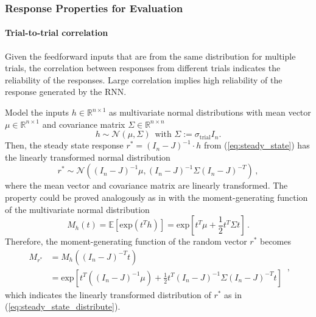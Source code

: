 \documentclass[11pt]{article}
\begin{document}
	\subsubsection{Response Properties for Evaluation} \label{sec:response_properties_for_evaluation}
	\paragraph{Trial-to-trial correlation} \label{para:ttc_sym}
	Given the feedforward inputs that are from the same distribution for multiple trials, the correlation between responses from different trials indicates the reliability of the responses. Large correlation implies high reliability of the response generated by the RNN. 
	
	Model the inputs $h \in \mathbb{R} ^{n \times 1}$ as multivariate normal distributions with mean vector $\mu \in \mathbb{R}^{n \times 1}$ and covariance matrix $\Sigma \in \mathbb{R}^{n \times n}$
		\begin{equation} \label{eq:input_distribution}
			h \sim \mathcal{N} (\mu, \Sigma) \, \text{ with } \Sigma := \sigma_{\text{trial}}I_n. 
		\end{equation}
	Then, the steady state response $r^* = (I_n - J)^{-1} \cdot h $ from (\ref{eq:steady_state}) has the linearly transformed normal distribution
		\begin{equation} \label{eq:steady_state_distribute}
			r^* \sim \mathcal{N} \left((I_n - J)^{-1}\mu, (I_n - J)^{-1} \Sigma (I_n -J)^{-T}\right) \, ,
		\end{equation}
	where the mean vector and covariance matrix are linearly transformed. The property could be proved analogously as in \cite{Soch2019} with the moment-generating function of the multivariate normal distribution
		\begin{equation}
			M_h(t) = \mathbb{E}\left[\text{exp}(t^Th)\right] = \text{exp} \left[t^T \mu + \frac{1}{2} t^T \Sigma t \right] \, .
		\end{equation}
	Therefore, the moment-generating function of the random vector $r^*$ becomes
		\begin{equation}
			\begin{split}
				M_{r^*} & = M_h \left( (I_n-J)^{-T} t\right) \\
				        & = \text{exp} \left[
				         						t^T \left( (I_n - J)^{-1} \mu\right) + \frac{1}{2} t^T (I_n - J)^{-1} \Sigma (I_n - J)^{-T} t    
				         				\right]
			\end{split} \, ,
		\end{equation}
	which indicates the linearly transformed distribution of $r^*$ as in (\ref{eq:steady_state_distribute}).
	
\end{document}
